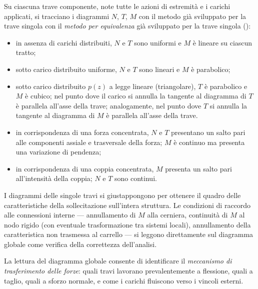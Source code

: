 Su ciascuna trave componente, note tutte le azioni di estremità e i carichi applicati, si tracciano 
i diagrammi $N$, $T$, $M$ con il metodo già sviluppato per la trave singola con il \emph{metodo per equivalenza} 
già sviluppato per la trave singola ():

\begin{itemize}
	\item in assenza di carichi distribuiti,
	$N$ e $T$ sono uniformi e $M$ è lineare
	su ciascun tratto;
	
	\item sotto carico distribuito uniforme,
	$N$ e $T$ sono lineari e $M$ è parabolico;
	
	\item sotto carico distribuito $p(z)$ a legge lineare
	(triangolare), $T$ è parabolico e $M$ è cubico;
	nel punto dove il carico si annulla la tangente
	al diagramma di $T$ è parallela all'asse della
	trave; analogamente, nel punto dove $T$ si annulla
	la tangente al diagramma di $M$ è parallela
	all'asse della trave.
	
	\item in corrispondenza di una forza
	concentrata, $N$ e $T$ presentano un salto pari
	alle componenti assiale e trasversale della forza;
	$M$ è continuo ma presenta una variazione di pendenza;
	
	\item in corrispondenza di una coppia
	concentrata, $M$ presenta un salto pari
	all'intensità della coppia; $N$ e $T$
	sono continui.
\end{itemize}

I diagrammi delle singole travi si giustappongono
per ottenere il quadro delle caratteristiche
della sollecitazione sull'intera struttura.
Le condizioni di raccordo alle connessioni
interne --- annullamento di $M$ alla cerniera,
continuità di $M$ al nodo rigido (con eventuale
trasformazione tra sistemi locali), annullamento
della caratteristica non trasmessa al carrello
--- si leggono direttamente sul diagramma
globale come verifica della correttezza
dell'analisi.

La lettura del diagramma globale consente
di identificare il \emph{meccanismo di
	trasferimento delle forze}: quali travi
lavorano prevalentemente a flessione,
quali a taglio, quali a sforzo normale,
e come i carichi fluiscono verso i vincoli
esterni.

